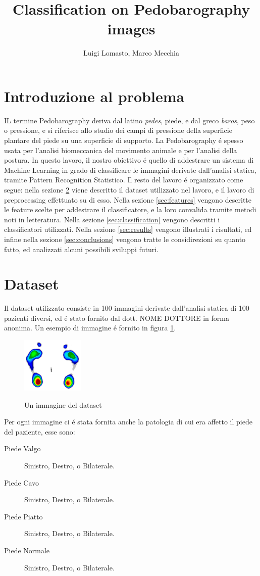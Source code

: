 \documentclass[11pt,a4paper]{article}
\begin{document}
\title{Classification on Pedobarography images}
\author{Luigi Lomasto, Marco Mecchia} 
\maketitle
\section{Introduzione al problema}
IL termine Pedobarography deriva dal latino \emph{pedes}, piede, e dal greco \emph{baros}, peso o pressione, e si riferisce allo studio dei campi di pressione della superficie plantare del piede su una superficie di supporto. La Pedobarography \'e spesso usata per l'analisi biomeccanica del movimento animale e per l'analisi della postura. In questo lavoro, il nostro obiettivo \'e quello di addestrare un sistema di Machine Learning in grado di classificare le immagini derivate dall'analisi statica, tramite Pattern Recognition Statistico.
Il resto del lavoro \'e organizzato come segue: nella sezione \ref{sec:dataset} viene descritto il dataset utilizzato nel lavoro, e il lavoro di preprocessing effettuato su di esso. Nella sezione \ref{sec:features} vengono descritte le feature scelte per addestrare il classificatore, e la loro convalida tramite metodi noti in letteratura. Nella sezione \ref{sec:classification} vengono descritti i classificatori utilizzati. Nella sezione \ref{sec:results} vengono illustrati i risultati, ed infine nella sezione \ref{sec:conclusions} vengono tratte le considirezioni su quanto fatto, ed analizzati alcuni possibili sviluppi futuri.

\section{Dataset}
\label{sec:dataset}
Il dataset utilizzato consiste in 100 immagini derivate dall'analisi statica di 100 pazienti diversi, ed \'e stato fornito dal dott. NOME DOTTORE in forma anonima. Un esempio di immagine \'e fornito in figura \ref{fig:immagineEsempio}. 
\begin{figure}
\centering
\includegraphics[height=100px, keepaspectratio]{4.png}
\label{fig:immagineEsempio}
\caption{Un immagine del dataset}
\end{figure}
Per ogni immagine ci \'e stata fornita anche la patologia di cui era affetto il piede del paziente, esse sono:
\begin{description}
\item[Piede Valgo] Sinistro, Destro, o Bilaterale.
\item[Piede Cavo] Sinistro, Destro, o Bilaterale.
\item[Piede Piatto] Sinistro, Destro, o Bilaterale.
\item[Piede Normale] Sinistro, Destro, o Bilaterale.
\end{description}
\end{document}
